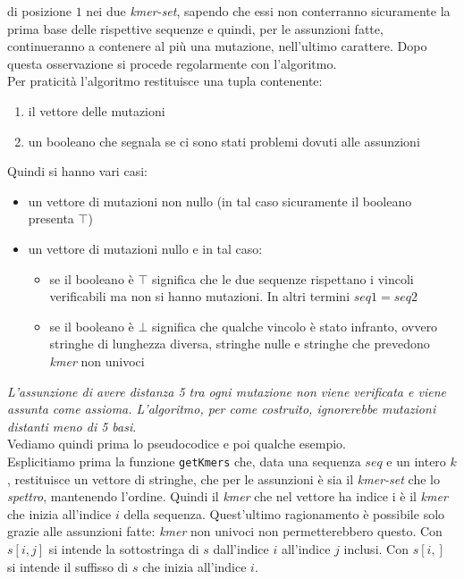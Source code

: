 \documentclass[a4paper,12pt, oneside]{book}
\begin{document}
di posizione $1$ nei due \textit{kmer-set}, sapendo che essi non conterranno
sicuramente la prima base delle rispettive sequenze e quindi, per le assunzioni
fatte, continueranno a contenere al più una mutazione, nell'ultimo
carattere. Dopo questa osservazione 
si procede regolarmente con l'algoritmo.\\
Per praticità l'algoritmo restituisce una tupla contenente:
\begin{enumerate}
  \item il vettore delle mutazioni
  \item un booleano che segnala se ci sono stati problemi dovuti alle assunzioni 
\end{enumerate}
Quindi si hanno vari casi:
\begin{itemize}
  \item un vettore di mutazioni non nullo (in tal caso sicuramente il booleano
  presenta $\top$)
  \item un vettore di mutazioni nullo e in tal caso:
  \begin{itemize}
    \item se il booleano è $\top$ significa che le due sequenze rispettano
    i vincoli verificabili ma non si hanno mutazioni. In altri termini
    $seq1=seq2$ 
    \item se il booleano è $\bot$ significa che qualche vincolo è stato
    infranto, ovvero stringhe di lunghezza diversa, stringhe nulle e stringhe
    che prevedono \textit{kmer} non univoci
  \end{itemize}
\end{itemize}
\textit{L'assunzione di avere distanza 5 tra ogni mutazione non viene verificata
  e viene assunta come assioma. L'algoritmo, per come costruito, ignorerebbe
  mutazioni distanti meno di 5 basi}.\\
Vediamo quindi prima lo pseudocodice e poi qualche esempio.\\
Esplicitiamo prima la funzione \texttt{getKmers} che, data una sequenza $seq$ e
un intero $k$, restituisce un vettore di stringhe, che per le assunzioni è sia
il \textit{kmer-set} che lo \textit{spettro}, mantenendo l'ordine. Quindi il
\textit{kmer} che nel vettore ha indice i è il \textit{kmer} che inizia
all'indice $i$ della sequenza. Quest'ultimo ragionamento è possibile solo grazie
alle assunzioni fatte: \textit{kmer} non univoci non permetterebbero questo. Con
$s[i,j]$ si intende la sottostringa di $s$ dall'indice $i$ all'indice $j$
inclusi. Con $s[i,]$ si intende il suffisso di $s$ che inizia all'indice $i$.\\
\end{document}
